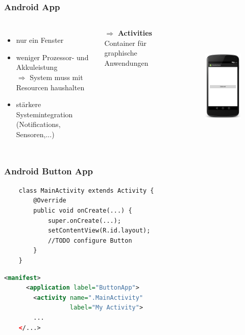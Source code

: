 \begin{frame}[c]
	\frametitle{Android App}
	\begin{columns}[t]
	\vspace{0.5cm}
	\begin{itemize}
	\item nur ein Fenster \pause \medskip
	\item weniger Prozessor- und Akkuleistung \pause \\
		$\Rightarrow$ System muss mit Resourcen haushalten \\ \medskip \pause 
	\item stärkere Systemintegration \\ (Notifications, Sensoren,...) \pause
	\end{itemize}
	\vspace{0.2cm}
	{\large $\Rightarrow$ \textbf{Activities}} \\
	\hspace{1cm}Container für graphische Anwendungen \pause

	\vspace{-1cm}
	\begin{figure}
	\includegraphics[height=6cm]{pictures/activities/button-android-framed.png}
	\end{figure}
	\end{columns}
\end{frame}

\begin{frame}[c,fragile]
	\frametitle{Android Button App}
	\begin{lstlisting}
	class MainActivity extends Activity {
	    @Override
	    public void onCreate(...) {
	        super.onCreate(...);
	        setContentView(R.id.layout);
	        //TODO configure Button
	    }
	}
	\end{lstlisting}
	\pause \vspace{0.5cm}
	\begin{lstlisting}[language=XML]
	<manifest>
	  <application label="ButtonApp">
	    <activity name=".MainActivity" 
	              label="My Activity">
        ...
	</...>
	\end{lstlisting}
\end{frame}

